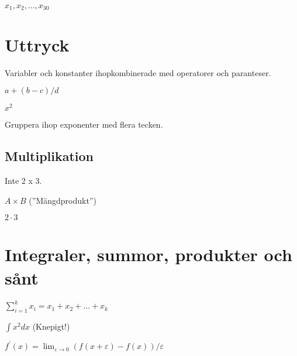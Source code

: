 \documentclass[12pt]{article}
\begin{document}
$x_1, x_2, \ldots, x_{30}$ 

\section{Uttryck}

Variabler och konstanter ihopkombinerade med operatorer och
paranteser.

$a + ( b - c ) / d$

$x^2$

Gruppera ihop exponenter med flera tecken.

\subsection{Multiplikation}

Inte 2 x 3. 

$A \times B$ (''Mängdprodukt'')

$2 \cdot 3$ 

\section{Integraler, summor, produkter och sånt}

$\sum_{i=1}^{k} x_{i} = x_1 + x_2 + \ldots + x_k$

$\int x^2 dx$   (Knepigt!)

$f^{\prime}(x)=\lim_{\varepsilon \to 0} (f(x+\varepsilon)-f(x))/\varepsilon$
\end{document}
